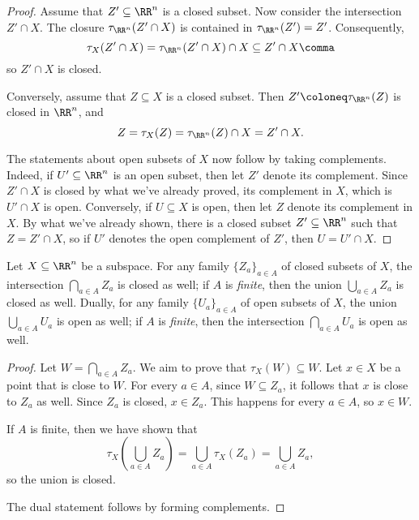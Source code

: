 \begin{proof}
	Assume that $Z' \subseteq \RR^n$ is a closed subset.
	Now consider the intersection $Z' \cap X$.
	The closure $\tau_{\RR^n}(Z' \cap X)$ is contained in $\tau_{\RR^n}(Z') = Z'$.
	Consequently,
	\[
		\tau_X(Z'\cap X) = \tau_{\RR^n}(Z'\cap X) \cap X \subseteq Z' \cap X \comma
	\]
	so $Z' \cap X $ is closed.
	
	Conversely, assume that $Z \subseteq X$ is a closed subset.
	Then $Z' \coloneq \tau_{\RR^n}(Z)$ is closed in $\RR^n$, and
	\[
		Z = \tau_X(Z) = \tau_{\RR^n}(Z) \cap X = Z' \cap X.
	\]

	The statements about open subsets of $X$ now follow by taking complements.%
	Indeed, if $U' \subseteq \RR^n$ is an open subset, then let $Z' $ denote its complement.
	Since $Z'\cap X$ is closed by what we've already proved, its complement in $X$, which is $U' \cap X$ is open.
	Conversely, if $U \subseteq X$ is open, then let $Z$ denote its complement in $X$.
	By what we've already shown, there is a closed subset $Z' \subseteq \RR^n$ such that $Z = Z' \cap X$, so if $U'$ denotes the open complement of $Z'$, then $U = U'\cap X$.
\end{proof}

\begin{prp}%
\label{prp:stability_properties_of_closeds_and_opens}
	Let $ X \subseteq \RR^n$ be a subspace.
	For any family $\{Z_a\}_{a\in A}$ of closed subsets of $X$, the intersection $ \bigcap_{a\in A} Z_a $ is closed as well;
	if $A$ is \emph{finite}, then the union $\bigcup_{a\in A} Z_a $ is closed as well.
	Dually, for any family $\{U_a\}_{a\in A}$ of open subsets of $X$, the union $ \bigcup_{a\in A} U_a $ is open as well;
	if $A$ is \emph{finite}, then the intersection $\bigcap_{a\in A} U_a $ is open as well.
\end{prp}

\begin{proof}
	Let $W = \bigcap_{a\in A} Z_a$.
	We aim to prove that $\tau_X(W) \subseteq W$.
	Let $x \in X$ be a point that is close to $W$.
	For every $a \in A$, since $W \subseteq Z_a$, it follows that $x$ is close to $Z_a$ as well.
	Since $Z_a$ is closed, $x \in Z_a$.
	This happens for every $a \in A$, so $x \in W$.

	If $A$ is finite, then we have shown that
	\[
		\tau_X\left(\bigcup_{a \in A} Z_a\right) = \bigcup_{a\in A} \tau_X(Z_a) = \bigcup_{a \in A} Z_a \comma
	\]
	so the union is closed.

	The dual statement follows by forming complements.
\end{proof}

